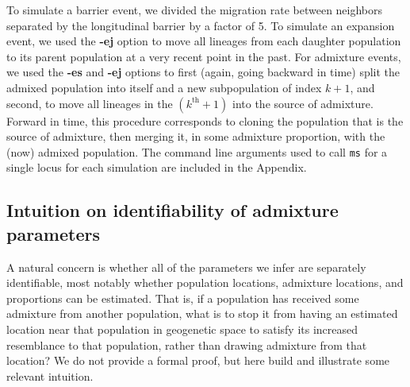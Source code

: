 \documentclass[10pt,letterpaper]{article}
\begin{document}
To simulate a barrier event, we divided the migration rate between neighbors separated by the longitudinal barrier by a factor of 5.  To simulate an expansion event, we used the \textbf{-ej} option to move all lineages from each daughter population to its parent population at a very recent point in the past.  For admixture events, we used the \textbf{-es} and \textbf{-ej} options to first (again, going backward in time) split the admixed population into itself and a new subpopulation of index $k + 1$, and second, to move all lineages in the $(k^{\text{th}} + 1)$ into the source of admixture.  Forward in time, this procedure corresponds to cloning the population that is the source of admixture, then merging it, in some admixture proportion, with the (now) admixed population.  The command line arguments used to call \texttt{ms} for a single locus for each simulation are included in the Appendix.

\subsection*{Intuition on identifiability of admixture parameters}
A natural concern is whether all of the parameters we infer are separately identifiable, most notably whether population locations, admixture locations, and proportions can be estimated. That is, if a population has received some admixture from another population, what is to stop it from having an estimated location near that population in geogenetic space to satisfy its increased resemblance to that population, rather than drawing admixture from that location?  We do not provide a formal proof, but here build and illustrate some relevant intuition.
\end{document}
